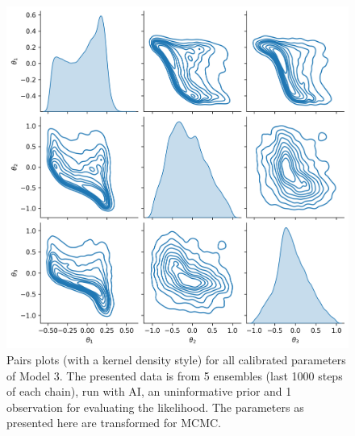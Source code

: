 \begin{figure}[ht]
\centering
\includegraphics[width=1.0\linewidth]{Figures/appendix_figs/kde_model3_Stretch.png}
\caption{Pairs plots (with a kernel density style) for all calibrated parameters of Model 3. The presented data is from 5 ensembles (last 1000 steps of each chain), run with AI, an uninformative prior and 1 observation for evaluating the likelihood. The parameters as presented here are transformed for MCMC.}\label{fig_kde_model3_AI}
\end{figure}


